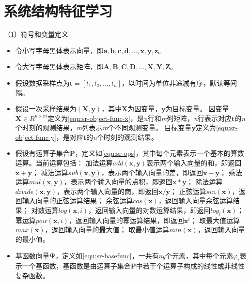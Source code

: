 \section{系统结构特征学习}
\label{sec:sr-feature}

（1）符号和变量定义

\begin{itemize}

  \item 令小写字母黑体表示向量，即$\mathbf{a,b,c,d,...,x,y,z}$。

  \item 令大写字母黑体表示矩阵，即$\mathbf{A,B,C,D,...,X,Y,Z}$。

  \item 假设数据采样点为$\mathbf{t}=[t_{1},t_{2},...,t_{n}]$，以时间为单位非递减有序，默认等间隔。

  \item 假设一次采样结果为$(\mathbf{X},\mathbf{y})$，其中$\mathbf{X}$为{\heiti 因变量}，$\mathbf{y}$为{\heiti 目标变量}。
  因变量$ \mathbf{X} \in R^{n\times m} $定义为\ref{equ:sr-object-func-x}，是\emph{n}行和\emph{m}列矩阵，\emph{n}行表示对应$\mathbf{t}$的\emph{n}个时刻的观测结果，\emph{m}列表示\emph{m}个不同观测变量。
  目标变量$\mathbf{y}$定义为\ref{equ:sr-object-func-y}，是对应$\mathbf{t}$的\emph{n}个时刻的观测结果。

  \item 假设有{\heiti 运算子}集合$\mathbf{P}$，定义如\ref{equ:sr-ops}，其中每个元素表示一个基本的算数运算。当前运算包括：
  加法运算$add(\mathbf{x,y})$表示两个输入向量的和，即返回$\mathbf{x}+\mathbf{y}$；
  减法运算$sub(\mathbf{x,y})$，表示两个输入向量的差，即返回$\mathbf{x}-\mathbf{y}$；
  乘法运算$mul(\mathbf{x,y})$，表示两个输入向量的点积，即返回$\mathbf{x} * \mathbf{y}$；
  除法运算$divide(\mathbf{x,y})$，表示两个输入向量的商，即返回$\mathbf{x}/\mathbf{y}$；
  正弦运算$sin(\mathbf{x})$，返回输入向量的正弦运算结果；
  余弦运算$cos(\mathbf{x})$，返回输入向量余弦运算结果；
  对数运算$log(\mathbf{x}, i) $，返回输入向量的对数运算结果，即返回$log_{i}(\mathbf{x})$；
  幂运算$pow(\mathbf{x}, i)$，返回输入向量的幂运算结果，即返回$\mathbf{x}^{i}$；
  取最大值运算$max(\mathbf{x})$，返回输入向量的最大值；
  取最小值运算$min(\mathbf{x})$，返回输入向量的最小值。
  \item 基函数向量$\mathbf{\Psi}$，定义如\ref{equ:sr-basefunc}，一共有$n_{b}$个元素，其中每个元素$\varphi_{i}$表示一个{\heiti 基函数}，基函数是由运算子集合$\mathbf{P}$中若干个运算子构成的线性或非线性复杂函数。

\end{itemize}
